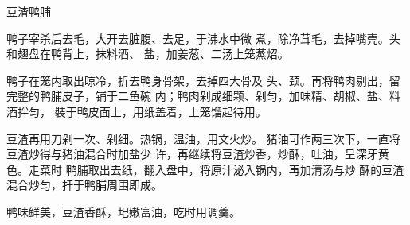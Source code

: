\begin{recipe}{豆渣鸭脯}

\ingredients



\cooking

\step 鸭子宰杀后去毛，大开去脏腹、去足，于沸水中微 煮，除净茸毛，去掉嘴壳。头和翅盘在鸭背上，抹料酒、 盐，加姜葱、二汤上笼蒸炤。

\step 鸭子在笼内取出晾冷，折去鸭身骨架，去掉四大骨及 头、颈。再将鸭肉剔出，留完整的鸭脯皮子，铺于二鱼碗 内；鸭肉剁成细颗、剁匀，加味精、胡椒、盐、料酒拌匀， 裝于鸭皮面上，用纸盖着，上笼馏起待用。

\step 豆渣再用刀剁一次、剁细。热锅，温油，用文火炒。 猪油可作两三次下，一直将豆渣炒得与猪油混合时加盐少 许，再继续将豆渣炒香，炒酥，吐油，呈深牙黄色。走菜时 鸭脯取出去纸，翻入盘中，将原汁泌入锅内，再加清汤与炒 酥的豆渣混合炒匀，扞于鸭脯周围即成。

\notes

鸭味鲜美，豆渣香酥，圯嫩富油，吃时用调羹。

\end{recipe}

